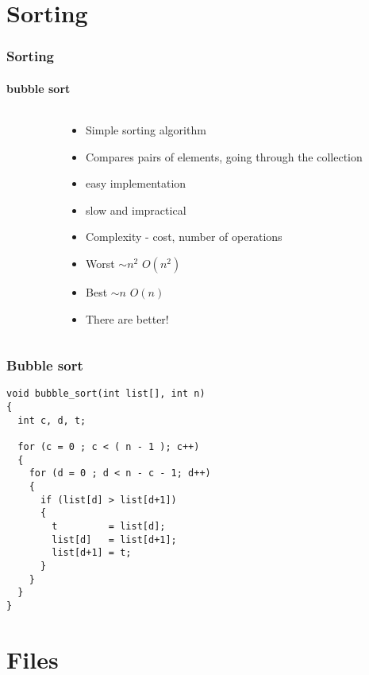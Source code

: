 \documentclass[10pt]{beamer}
\begin{document}
\section{Sorting}

\begin{frame}
  \frametitle{Sorting}
  \framesubtitle{bubble sort}
  \begin{columns}
    \begin{column}{0.6\textwidth}
    \end{column}
    \begin{column}{0.5\textwidth}
\begin{itemize}
  \item Simple sorting algorithm
  \item Compares pairs of elements, going through the collection
  \item easy implementation
  \item slow and impractical
  \item Complexity - cost, number of operations
  \item Worst $\sim n^2$ $O(n^2)$
  \item Best $\sim n$ $O(n)$
  \item There are better!
\end{itemize}
    \end{column}
  \end{columns}

\end{frame}

\begin{frame}[fragile]
  \frametitle{Bubble sort}
\begin{lstlisting}
void bubble_sort(int list[], int n)
{
  int c, d, t;
 
  for (c = 0 ; c < ( n - 1 ); c++)
  {
    for (d = 0 ; d < n - c - 1; d++)
    {
      if (list[d] > list[d+1])
      {
        t         = list[d];
        list[d]   = list[d+1];
        list[d+1] = t;
      }
    }
  }
}
\end{lstlisting}
\end{frame}

\section{Files}
\end{document}
